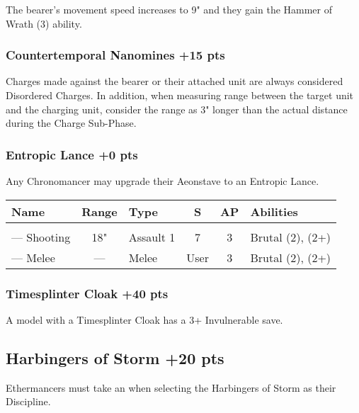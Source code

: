 The bearer's movement speed increases to 9" and they gain the Hammer of Wrath (3) ability.

\subsubsection[Countertemporal Nanomines]{Countertemporal Nanomines  \hrulefill +15 pts}

Charges made against the bearer or their attached unit are always considered Disordered Charges. In addition, when measuring range between the target unit and the charging unit, consider the range as 3" longer than the actual distance during the Charge Sub-Phase.

\subsubsection[Entropic Lance]{Entropic Lance  \hrulefill +0 pts} \label{Entropic Lance}

Any Chronomancer may upgrade their Aeonstave to an Entropic Lance.

\noindent
\begin{NiceTabular}{L{115 pt} c C{40pt} *{2}{c} >{\raggedright\arraybackslash}p{240pt}}
	Name & Range & Type & S & AP & Abilities \\
	\hline
	 &  &  &  &  & \\
	— Shooting & 18" & Assault 1 & 7 & 3 & Brutal (2),  (2+) \\
	— Melee & — & Melee & User & 3 & Brutal (2),  (2+) \\
\end{NiceTabular}

\subsubsection[Timesplinter Cloak ]{Timesplinter Cloak  \hrulefill +40 pts}

A model with a Timesplinter Cloak has a 3+ Invulnerable save.


\subsection[Harbingers of Storm ]{Harbingers of Storm  \hrulefill +20 pts}

Ethermancers must take an  when selecting the Harbingers of Storm as their Discipline.

